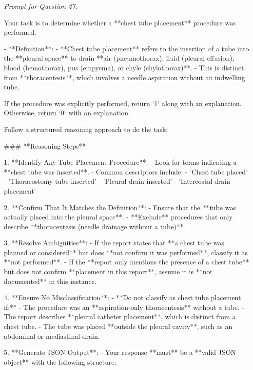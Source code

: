 \textit{\normalsize Prompt for Question  27:}
\begin{mdframed}[]
\normalsize

Your task is to determine whether a **chest tube placement** procedure was performed.  

- **Definition**:  
  - **Chest tube placement** refers to the insertion of a tube into the **pleural space** to drain **air (pneumothorax), fluid (pleural effusion), blood (hemothorax), pus (empyema), or chyle (chylothorax)**.  
  - This is distinct from **thoracentesis**, which involves a needle aspiration without an indwelling tube.  

If the procedure was explicitly performed, return `1` along with an explanation. Otherwise, return `0` with an explanation.

Follow a structured reasoning approach to do the task:

### **Reasoning Steps**  

1. **Identify Any Tube Placement Procedure**:  
   - Look for terms indicating a **chest tube was inserted**.  
   - Common descriptors include:  
     - 'Chest tube placed'  
     - 'Thoracostomy tube inserted'  
     - 'Pleural drain inserted'  
     - 'Intercostal drain placement'  

2. **Confirm That It Matches the Definition**:  
   - Ensure that the **tube was actually placed into the pleural space**.  
   - **Exclude** procedures that only describe **thoracentesis (needle drainage without a tube)**.  

3. **Resolve Ambiguities**:  
   - If the report states that **a chest tube was planned or considered** but does **not confirm it was performed**, classify it as **not performed**.  
   - If the **report only mentions the presence of a chest tube** but does not confirm **placement in this report**, assume it is **not documented** in this instance.  

4. **Ensure No Misclassification**:  
   - **Do not classify as chest tube placement if:**  
     - The procedure was an **aspiration-only thoracentesis** without a tube.  
     - The report describes **pleural catheter placement**, which is distinct from a chest tube.  
     - The tube was placed **outside the pleural cavity**, such as an abdominal or mediastinal drain.  

5. **Generate JSON Output**:  
   - Your response **must** be a **valid JSON object** with the following structure:  

\end{mdframed}

